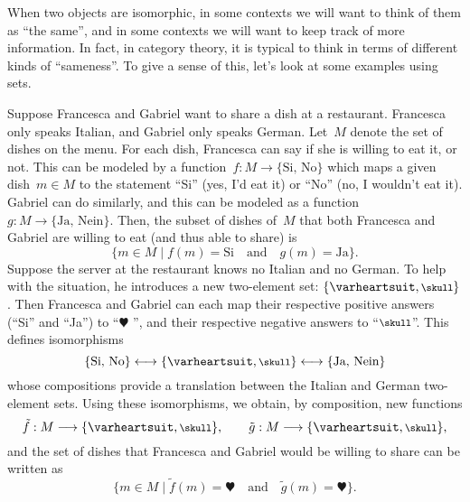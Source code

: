 When two objects are isomorphic, in some contexts we will want to think of them as ``the same'', and in some contexts we will want to keep track of more information. In fact, in category theory, it is typical to think in terms of different kinds of ``sameness''. To give a sense of this, let's look at some examples using sets.



\begin{example}
Suppose Francesca and Gabriel want to share a dish at a restaurant. Francesca only speaks Italian, and Gabriel only speaks German. Let~$M$ denote the set of dishes on the menu. For each dish, Francesca can say if she is willing to eat it, or not. This can be modeled by a function~$f\colon M \to \{ \text{Si, No} \}$ which maps a given dish~$m \in M$ to the statement ``Si'' (yes, I'd eat it) or ``No'' (no, I wouldn't eat it). Gabriel can do similarly, and this can be modeled as a function~$g\colon M \to \{ \text{Ja, Nein} \}$. 
Then, the subset of dishes of~$M$ that both Francesca and Gabriel are willing to eat (and thus able to share) is
\begin{equation*}
\{ m \in M \mid f(m) = \text{Si} \quad \text{and} \quad g(m) = \text{Ja} \}. 
\end{equation*}
Suppose the server at the restaurant knows no Italian and no German. To help with the situation, he introduces a new two-element set: $\{ \varheartsuit, \mbox{\footnotesize $\skull$} \}$. Then Francesca and Gabriel can each map their respective positive answers (``Si'' and ``Ja'') to ``$\varheartsuit$ '', and their respective negative answers to ``$\mbox{\footnotesize $\skull$}$''. This defines isomorphisms 
\begin{equation*}
\{ \text{Si, No} \} \longleftrightarrow \{ \varheartsuit, \mbox{\footnotesize $\skull$} \} \longleftrightarrow \{ \text{Ja, Nein} \}
\end{equation*}
whose compositions provide a translation between the Italian and German two-element sets. Using these isomorphisms, we obtain, by composition, new functions 
\begin{equation*}
\tilde f:  M \longrightarrow \{ \varheartsuit, \mbox{\footnotesize $\skull$} \}, \qquad \tilde g: M \longrightarrow \{ \varheartsuit, \mbox{\footnotesize $\skull$} \},
\end{equation*}
and the set of dishes that Francesca and Gabriel would be willing to share can be written as
\begin{equation*}
\{ m \in M \mid \tilde f(m) = \varheartsuit \quad \text{and} \quad \tilde g(m) = \varheartsuit \}. 
\end{equation*}


\end{example}
